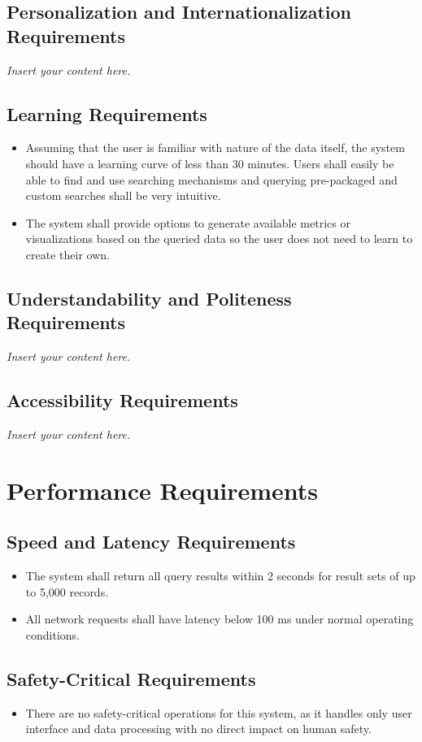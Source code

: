 \documentclass[12pt]{article}
\newcommand{\lips}{\textit{Insert your content here.}}
\begin{document}
\subsection{Personalization and Internationalization Requirements}
\lips



\subsection{Learning Requirements}

\begin{itemize}
    \item Assuming that the user is familiar with nature of the data itself, the system should
    have a learning curve of less than 30 minutes. Users shall easily be able to find and use searching
    mechanisms and querying pre-packaged and custom searches shall be very intuitive.
    \item The system shall provide options to generate available metrics or visualizations based on the queried
    data so the user does not need to learn to create their own.
\end{itemize}

\subsection{Understandability and Politeness Requirements}
\lips
\subsection{Accessibility Requirements}
\lips

\section{Performance Requirements}

\subsection{Speed and Latency Requirements}
\begin{itemize}
    \item The system shall return all query results within 2 seconds for result sets of up to 5,000 records.
    \item All network requests shall have latency below 100 ms under normal operating conditions.
\end{itemize}

\subsection{Safety-Critical Requirements}
\begin{itemize}
    \item There are no safety-critical operations for this system, as it handles only user interface and data processing with no direct impact on human safety.
\end{itemize}
\end{document}

